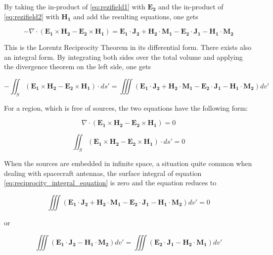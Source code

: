 \documentclass[a4paper,11pt]{report}
\begin{document}
By taking the in-product of \ref{eq:rezifield1} with $\mathbf{E_2}$ and the in-product of \ref{eq:rezifield2} with $\mathbf{H_1}$ and add the resulting equations, one gets

\begin{equation}
 - \nabla \cdot (\mathbf{E_1} \times \mathbf{H_2}- \mathbf{E_2} \times \mathbf{H_1})=\mathbf{E_1} \cdot \mathbf{J_2}+\mathbf{H_2} \cdot \mathbf{M_1} - \mathbf{E_2} \cdot \mathbf{J_1}-\mathbf{H_1} \cdot \mathbf{M_2}
\end{equation}

This is the Lorentz Reciprocity Theorem in its differential form. There exists also an integral form. By integrating both sides over the total volume and applying the divergence theorem on the left side, one gets

\begin{equation}
 - \iint_S (\mathbf{E_1} \times \mathbf{H_2}- \mathbf{E_2} \times \mathbf{H_1}) \cdot ds'=\iiint (\mathbf{E_1} \cdot \mathbf{J_2}+\mathbf{H_2} \cdot \mathbf{M_1} - \mathbf{E_2} \cdot \mathbf{J_1}-\mathbf{H_1} \cdot \mathbf{M_2}) dv' \label{eq:reciprocity_integral_equation}
\end{equation}
 
For a region, which is free of sources, the two equations have the following form:

\begin{equation}
 \nabla \cdot (\mathbf{E_1} \times \mathbf{H_2}- \mathbf{E_2} \times \mathbf{H_1})=0
\end{equation}

\begin{equation}
 \iint_S (\mathbf{E_1} \times \mathbf{H_2}- \mathbf{E_2} \times \mathbf{H_1}) \cdot ds'=0
\end{equation}

When the sources are embedded in infinite space, a situation quite common when dealing with spacecraft antennas, the surface integral of equation \ref{eq:reciprocity_integral_equation} is zero and the equation reduces to

\begin{equation}
 \iiint (\mathbf{E_1} \cdot \mathbf{J_2}+\mathbf{H_2} \cdot \mathbf{M_1} - \mathbf{E_2} \cdot \mathbf{J_1}-\mathbf{H_1} \cdot \mathbf{M_2}) dv'=0 \label{eq:reciprocity_integral_infinite}
\end{equation}

or

\begin{equation}
 \iiint (\mathbf{E_1} \cdot \mathbf{J_2} -\mathbf{H_1} \cdot \mathbf{M_2}) dv' =  \iiint(\mathbf{E_2} \cdot \mathbf{J_1}-\mathbf{H_2} \cdot \mathbf{M_1} )dv'
\end{equation}
\end{document}
